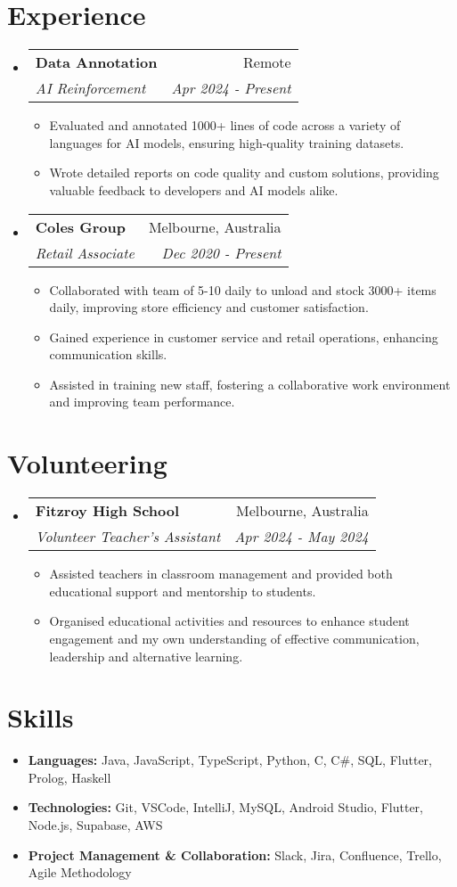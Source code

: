 \documentclass[letterpaper,11pt]{article}
\makeatletter
\newcommand{\resumeItem}[1]{
  \item\small{
    {#1 \vspace{-2pt}}
  }
}
\newcommand{\resumeSubheading}[4]{
  \vspace{-1pt}\item
    \begin{tabular*}{0.97\textwidth}{l@{\extracolsep{\fill}}r}
      \textbf{#1} & #2 \\
      \textit{\small#3} & \textit{\small #4} \\
    \end{tabular*}\vspace{-5pt}
}
\newcommand{\resumeSubHeadingListStart}{\begin{itemize}[leftmargin=*]}
\newcommand{\resumeSubHeadingListEnd}{\end{itemize}}
\newcommand{\resumeItemListStart}{\begin{itemize}}
\newcommand{\resumeItemListEnd}{\end{itemize}\vspace{-5pt}}
\makeatother
\begin{document}
\section{Experience}
\resumeSubHeadingListStart

\resumeSubheading
{Data Annotation}{Remote}
{AI Reinforcement}{Apr 2024 - Present}
\resumeItemListStart
\resumeItem{}{Evaluated and annotated 1000+ lines of code across a variety of languages for AI models, ensuring high-quality training datasets.}
\resumeItem{}{Wrote detailed reports on code quality and custom solutions, providing valuable feedback to developers and AI models alike.}
\resumeItemListEnd

\resumeSubheading
{Coles Group}{Melbourne, Australia}
{Retail Associate}{Dec 2020 - Present}
\resumeItemListStart
\resumeItem{}{Collaborated with team of 5-10 daily to unload and stock 3000+ items daily, improving store efficiency and customer satisfaction.}
\resumeItem{}{Gained experience in customer service and retail operations, enhancing communication skills.}
\resumeItem{}{Assisted in training new staff, fostering a collaborative work environment and improving team performance.}
\resumeItemListEnd
\resumeSubHeadingListEnd

\section{Volunteering}
\resumeSubHeadingListStart

\resumeSubheading
{Fitzroy High School}{Melbourne, Australia}
{Volunteer Teacher's Assistant}{Apr 2024 - May 2024}
\resumeItemListStart
\resumeItem{}{Assisted teachers in classroom management and provided both educational support and mentorship to students.}
\resumeItem{}{Organised educational activities and resources to enhance student engagement and my own understanding of effective communication, leadership and alternative learning.}
\resumeItemListEnd

\resumeSubHeadingListEnd

%
\section{Skills}
\resumeSubHeadingListStart
\item{\textbf{Languages:} Java, JavaScript, TypeScript, Python, C, C\#, SQL, Flutter, Prolog, Haskell}
\item{\textbf{Technologies:} Git, VSCode, IntelliJ, MySQL, Android Studio, Flutter, Node.js, Supabase, AWS}
\item{\textbf{Project Management \& Collaboration:} Slack, Jira, Confluence, Trello, Agile Methodology}
\resumeSubHeadingListEnd

\end{document}
